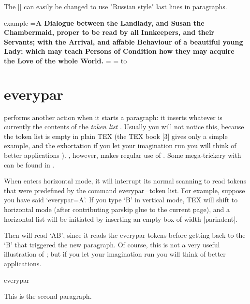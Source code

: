 \def\weirdtitlei#1{%
       \bgroup
       \setbox0=\vbox{\bf\noindent #1}%
       \setbox1=\vbox{%
            \unvbox0
            \setbox2=\lastbox
            \hbox to \linewidth{\hfill\unhbox2}%
       }%
       \unvbox1
      \egroup
  }%

The |\hbox| can easily be changed to use "Russian style" last lines in paragraphs.

\begin{scriptexample}{example}{}
\weirdtitlei{A Dialogue between the Landlady, and Susan the Chambermaid, proper to be
read by all Innkeepers, and their Servants; with the Arrival, and
affable Behaviour of a beautiful young Lady; which may teach Persons of
Condition how they may acquire the Love of the whole World.}
\end{scriptexample}

\section{everypar}

\tex performs another action when it starts a paragraph:
it inserts whatever is currently the contents of the \emph{token
list} . Usually you will not notice this, because
the token list is empty in plain TEX (the TEX book [3]
gives only a simple example, and the exhortation  if you
let your imagination run you will think of better applications ).
\latex, however, makes regular use of
. Some mega-trickery with 
can be found in \cite{Lamport1994}. 

When \tex enters horizontal mode, it will interrupt its normal scanning to read
tokens that were predefined by the command everypar={token list}. For
example, suppose you have said `everypar={A}'. If you type `B' in vertical mode, TEX
will shift to horizontal mode (after contributing parskip glue to the current page),
and a horizontal list will be initiated by inserting an empty box of width |parindent|.

Then \tex will read `AB', since it reads the everypar tokens before getting back to the
`B' that triggered the new paragraph. Of course, this is not a very useful illustration of
; but if you let your imagination run you will think of better applications.

\begin{texexample}{everypar}{}
\def\makefirstwordbold#1.{\textbf{#1 }}
\everypar{\makefirstwordbold}
This is the first paragraph.\par
This is the second paragraph.\par
\everypar{}
\end{texexample}


